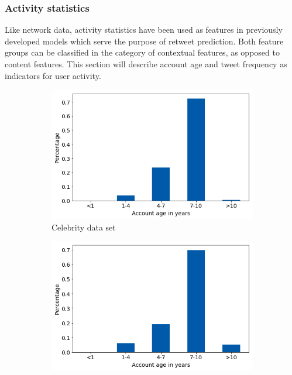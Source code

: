 \subsubsection{Activity statistics}
\label{sec:activity_stats}

Like network data, activity statistics have been used as features in previously
developed models which serve the purpose of retweet prediction.
Both feature groups can be classified in the category of contextual features,
as opposed to content features.
This section will describe account age and tweet frequency as indicators
for user activity.

\begin{figure}[h]
\begin{subfigure}{.33\textwidth}
  \includegraphics[width=.95\linewidth]{img/celeb_age_distr}
  \caption{Celebrity data set}
  \label{fig:age_distr_sub1}
\end{subfigure}%
\begin{subfigure}{.33\textwidth}
  \includegraphics[width=.95\linewidth]{img/polit_age_distr}

\end{subfigure}
\end{figure}
